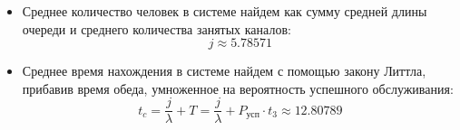 \begin{itemize}
	\item Среднее количество человек в системе найдем как сумму средней длины очереди и среднего количества занятых каналов: 
	\begin{displaymath}
		j \approx 5.78571
	\end{displaymath}
	
	\item Среднее время нахождения в системе найдем с помощью закону Литтла, прибавив время обеда, умноженное на вероятность успешного обслуживания:
	\begin{displaymath}
		t_c = \dfrac{j}{\lambda} + T = \dfrac{j}{\lambda} + P_\text{усп} \cdot t_3 \approx 12.80789
	\end{displaymath}
\end{itemize}
	
